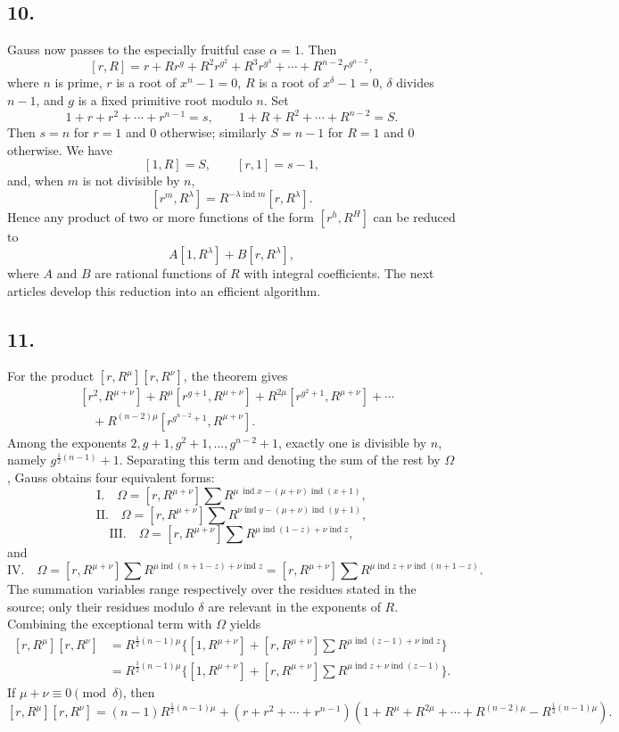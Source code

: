\documentclass[12pt]{article}
\begin{document}
\subsection*{10.}

Gauss now passes to the especially fruitful case $\alpha=1$. Then
\[
[r,R]=r+Rr^g+R^2r^{g^2}+R^3r^{g^3}+\cdots+R^{n-2}r^{g^{n-2}},
\]
where $n$ is prime, $r$ is a root of $x^n-1=0$, $R$ is a root of $x^\delta-1=0$, $\delta$ divides $n-1$, and $g$ is a fixed primitive root modulo $n$. Set
\[
1+r+r^2+\cdots+r^{n-1}=s,\qquad
1+R+R^2+\cdots+R^{n-2}=S.
\]
Then $s=n$ for $r=1$ and $0$ otherwise; similarly $S=n-1$ for $R=1$ and $0$ otherwise. We have
\[
[1,R]=S,\qquad [r,1]=s-1,
\]
and, when $m$ is not divisible by $n$,
\[
[r^m,R^\lambda]=R^{-\lambda\operatorname{ind}m}[r,R^\lambda].
\]
Hence any product of two or more functions of the form $[r^h,R^H]$ can be reduced to
\[
A[1,R^\lambda]+B[r,R^\lambda],
\]
where $A$ and $B$ are rational functions of $R$ with integral coefficients. The next articles develop this reduction into an efficient algorithm.

\subsection*{11.}

For the product $[r,R^\mu][r,R^\nu]$, the theorem gives
\[
\begin{aligned}
{}&[r^2,R^{\mu+\nu}]
+R^\mu[r^{g+1},R^{\mu+\nu}]
+R^{2\mu}[r^{g^2+1},R^{\mu+\nu}]
+\cdots\\
&\quad+R^{(n-2)\mu}[r^{g^{n-2}+1},R^{\mu+\nu}].
\end{aligned}
\]
Among the exponents $2,g+1,g^2+1,\ldots,g^{n-2}+1$, exactly one is divisible by $n$, namely $g^{\frac12(n-1)}+1$. Separating this term and denoting the sum of the rest by $\Omega$, Gauss obtains four equivalent forms:
\[
\text{I.}\quad
\Omega=[r,R^{\mu+\nu}]\sum R^{\mu\,\operatorname{ind}x-(\mu+\nu)\operatorname{ind}(x+1)},
\]
\[
\text{II.}\quad
\Omega=[r,R^{\mu+\nu}]\sum R^{\nu\operatorname{ind}y-(\mu+\nu)\operatorname{ind}(y+1)},
\]
\[
\text{III.}\quad
\Omega=[r,R^{\mu+\nu}]\sum R^{\mu\operatorname{ind}(1-z)+\nu\operatorname{ind}z},
\]
and
\[
\text{IV.}\quad
\Omega=[r,R^{\mu+\nu}]\sum R^{\mu\operatorname{ind}(n+1-z)+\nu\operatorname{ind}z}
=[r,R^{\mu+\nu}]\sum R^{\mu\operatorname{ind}z+\nu\operatorname{ind}(n+1-z)}.
\]
The summation variables range respectively over the residues stated in the source; only their residues modulo $\delta$ are relevant in the exponents of $R$. Combining the exceptional term with $\Omega$ yields
\[
\begin{aligned}
[r,R^\mu][r,R^\nu]&=R^{\frac12(n-1)\mu}\{[1,R^{\mu+\nu}]
+[r,R^{\mu+\nu}]\sum R^{\mu\operatorname{ind}(z-1)+\nu\operatorname{ind}z}\}\\
&=R^{\frac12(n-1)\mu}\{[1,R^{\mu+\nu}]
+[r,R^{\mu+\nu}]\sum R^{\mu\operatorname{ind}z+\nu\operatorname{ind}(z-1)}\}.
\end{aligned}
\]
If $\mu+\nu\equiv0\pmod\delta$, then
\[
[r,R^\mu][r,R^\nu]=(n-1)R^{\frac12(n-1)\mu}
+(r+r^2+\cdots+r^{n-1})(1+R^\mu+R^{2\mu}+\cdots+R^{(n-2)\mu}-R^{\frac12(n-1)\mu}).
\]
\end{document}
